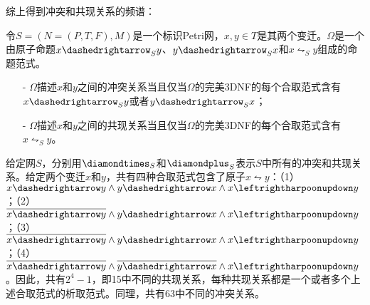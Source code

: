 综上得到冲突和共现关系的频谱：
\begin{definition}[冲突和共现关系的频谱]\label{def:spectrum_of_conflict_cooccurence}
令$S=(N=(P,T,F),M)$是一个标识Petri网，$x,y\in T$是其两个变迁。$\Omega$是一个由原子命题$x\dashedrightarrow_{S}y$、$y\dashedrightarrow_{S}x$和$x\leftrightharpoonupdown_{S}y$组成的命题范式。
  \begin{itemize}
    \item[-] $\Omega$描述$x$和$y$之间的冲突关系当且仅当$\Omega$的完美3DNF的每个合取范式含有$x\dashedrightarrow_{S}y$或者$y\dashedrightarrow_{S}x$；
    \item[-] $\Omega$描述$x$和$y$之间的共现关系当且仅当$\Omega$的完美3DNF的每个合取范式含有$x\leftrightharpoonupdown_{S}y$。
  \end{itemize}
\end{definition}
给定网$S$，分别用$\diamondtimes_{S}$和$\diamondplus_{S}$表示$S$中所有的冲突和共现关系。给定两个变迁$x$和$y$，共有四种合取范式包含了原子$x\leftrightharpoonupdown y$：（1）$x\dashedrightarrow y\wedge y\dashedrightarrow x\wedge x\leftrightharpoonupdown y$；（2）$\overline{x\dashedrightarrow y}\wedge y\dashedrightarrow x\wedge x\leftrightharpoonupdown y$；（3）$\overline{x\dashedrightarrow y}\wedge y\dashedrightarrow x\wedge x\leftrightharpoonupdown y$；（4）$\overline{x\dashedrightarrow y}\wedge\overline{y\dashedrightarrow x}\wedge x\leftrightharpoonupdown y$。因此，共有$2^{4}-1$，即15中不同的共现关系，每种共现关系都是一个或者多个上述合取范式的析取范式。同理，共有63中不同的冲突关系。

